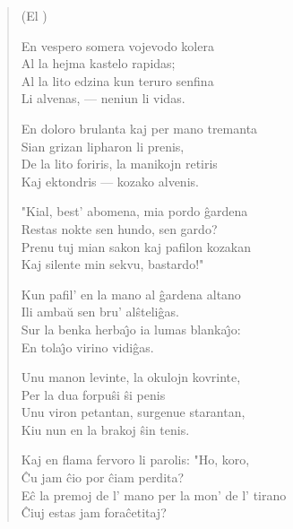 \begin{verse}
\begin{center}
\footnotesize (El )
\end{center}

                  En vespero somera vojevodo kolera\\
                  Al la hejma kastelo rapidas;\\
                  Al la lito edzina kun teruro senfina\\
                  Li alvenas, --- neniun li vidas.

                  En doloro brulanta kaj per mano tremanta\\
                  Sian grizan lipharon li prenis,\\
                  De la lito foriris, la manikojn retiris\\
                  Kaj ektondris --- kozako alvenis.

                  "Kial, best' abomena, mia pordo \^gardena\\
                  Restas nokte sen hundo, sen gardo?\\
                  Prenu tuj mian sakon kaj pafilon kozakan\\
                  Kaj silente min sekvu, bastardo!"

                  Kun pafil' en la mano al \^gardena altano\\
                  Ili amba\u u sen bru' al\^steli\^gas.\\
                  Sur la benka herba\^{\j}o ia lumas
                  blanka\^{\j}o:\\
                  En tola\^{\j}o virino vidi\^gas.

                  Unu manon levinte, la okulojn kovrinte,\\
                  Per la dua forpu\^si \^si penis\\
                  Unu viron petantan, surgenue starantan,\\
                  Kiu nun en la brakoj \^sin tenis.

                  Kaj en flama fervoro li parolis: "Ho, koro,\\
                  \^Cu jam \^cio por \^ciam perdita?\\
                  E\^c la premoj de l' mano per la mon' de l'
                  tirano\\
                  \^Ciuj estas jam fora\^cetitaj?


\end{verse}
